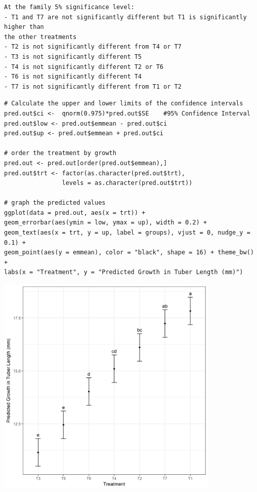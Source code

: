 \documentclass[a4paper, 10pt, fleqn, twosided]{memoir}
\begin{document}
\begin{tcolorbox}[title = Example 2 Prediction interpretation]
\begin{verbatim}
At the family 5% significance level:
- T1 and T7 are not significantly different but T1 is significantly higher than
the other treatments
- T2 is not significantly different from T4 or T7
- T3 is not significantly different T5
- T4 is not significantly different T2 or T6
- T6 is not significantly different T4
- T7 is not significantly different from T1 or T2
\end{verbatim}
\end{tcolorbox}
\begin{tcolorbox}[title = Example 2 Graph of predicted values]
\begin{verbatim}
# Calculate the upper and lower limits of the confidence intervals
pred.out$ci <-  qnorm(0.975)*pred.out$SE    #95% Confidence Interval
pred.out$low <- pred.out$emmean - pred.out$ci
pred.out$up <- pred.out$emmean + pred.out$ci

# order the treatment by growth
pred.out <- pred.out[order(pred.out$emmean),]
pred.out$trt <- factor(as.character(pred.out$trt),
                levels = as.character(pred.out$trt))
 
# graph the predicted values 
ggplot(data = pred.out, aes(x = trt)) +
geom_errorbar(aes(ymin = low, ymax = up), width = 0.2) +
geom_text(aes(x = trt, y = up, label = groups), vjust = 0, nudge_y = 0.1) +
geom_point(aes(y = emmean), color = "black", shape = 16) + theme_bw() +
labs(x = "Treatment", y = "Predicted Growth in Tuber Length (mm)")
\end{verbatim}
\end{tcolorbox}


\begin{tcolorbox}[title = Example 2 Graph of predicted values]
\includegraphics[width=0.8\textwidth, frame]{Example2Pred.png}
\end{tcolorbox}
\end{document}
